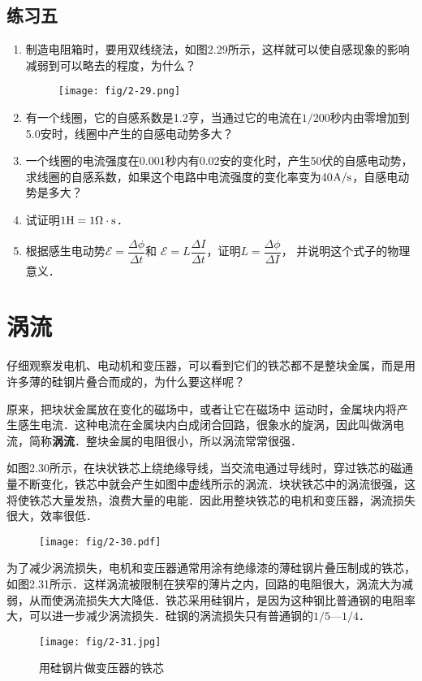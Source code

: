 \subsection*{练习五}
\begin{enumerate}
    \item 制造电阻箱时，要用双线绕法，如图2.29所示，这样就可以使自感现象的影响减弱到可以略去的程度，为什么？
    \begin{figure}[htp]\centering
\texttt{[image: fig/2-29.png]}
\caption{}
\end{figure}

    \item 有一个线圈，它的自感系数是1.2亨，当通过它的电流在$1/200$秒内由零增加到5.0安时，线圈中产生的自感电动势多大？
    \item 一个线圈的电流强度在0.001秒内有0.02安的变化时，产生50伏的自感电动势，求线圈的自感系数，如果这个电路中电流强度的变化率变为40${\rm A}/{\rm s}$，自感电动势是多大？
    \item 试证明$1{\rm H}=1\Omega\cdot {\rm s}$．
    \item 根据感生电动势$\mathcal{E}=\dfrac{\Delta \phi}{\Delta t}$和 $\mathcal{E}=L\dfrac{\Delta I}{\Delta t}$，证明$L=\dfrac{\Delta \phi}{\Delta I}$，
    并说明这个式子的物理意义．
\end{enumerate}

\section{涡流}

仔细观察发电机、电动机和变压器，可以看到它们的铁芯都不是整块金属，而是用许多薄的硅钢片叠合而成的，为什么要这样呢？

原来，把块状金属放在变化的磁场中，或者让它在磁场中
运动时，金属块内将产生感生电流．这种电流在金属块内白成闭合回路，很象水的旋涡，因此叫做涡电流，简称\textbf{涡流}．整块金属的电阻很小，所以涡流常常很强．

如图2.30所示，在块状铁芯上绕绝缘导线，当交流电通过导线时，穿过铁芯的磁通量不断变化，铁芯中就会产生如图中虚线所示的涡流．块状铁芯中的涡流很强，这将使铁芯大量发热，浪费大量的电能．因此用整块铁芯的电机和变压器，涡流损失很大，效率很低．
\begin{figure}[htp]
    \centering
    \texttt{[image: fig/2-30.pdf]}
    \caption{}
\end{figure}

为了减少涡流损失，电机和变压器通常用涂有绝缘漆的薄硅钢片叠压制成的铁芯，如图2.31所示．这样涡流被限制在狭窄的薄片之内，回路的电阻很大，涡流大为减弱，从而使涡流损失大大降低．铁芯采用硅钢片，是因为这种钢比普通钢的电阻率大，可以进一步减少涡流损失．硅钢的涡流损失只有普通钢的$1/5$—$1/4$．
\begin{figure}[htp]
    \centering
    \texttt{[image: fig/2-31.jpg]}
    \caption{用硅钢片做变压器的铁芯}
\end{figure}

